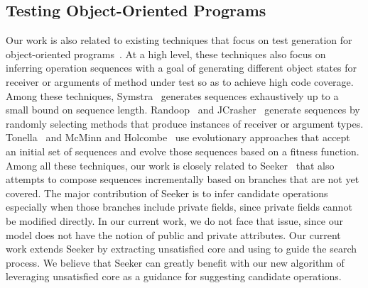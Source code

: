 \subsection{Testing Object-Oriented Programs}

Our work is also related to existing techniques that focus on test 
generation for object-oriented programs~\cite{pacheco2007,tillmann2008,thummalapenta2011, xie:symstra,
csallner:jcrasher, phil:evo, tonella:etoc}. At a high level,
these techniques also focus on inferring operation sequences 
with a goal of generating different object states for receiver
or arguments of method under test so as to achieve high code coverage.
Among these techniques, Symstra~\cite{xie:symstra} generates sequences
exhaustively up to a small bound on sequence length. 
Randoop~\cite{pacheco2007} and JCrasher~\cite{csallner:jcrasher} generate
sequences by randomly selecting methods that produce instances of receiver
or argument types. Tonella~\cite{tonella:etoc} and McMinn and Holcombe~\cite{phil:evo}
use evolutionary approaches that accept an initial set of sequences
and evolve those sequences based on a fitness function. Among all
these techniques, our work is closely related to Seeker~\cite{thummalapenta2011}
that also attempts to compose sequences incrementally based on branches that
are not yet covered. The major contribution of Seeker is to infer
candidate operations especially when those branches include private fields,
since private fields cannot be modified directly. In our current work,
we do not face that issue, since our model does not have the notion of public
and private attributes. Our current work extends Seeker by extracting
unsatisfied core and using to guide the search process. 
We believe that Seeker can greatly benefit with
our new algorithm of leveraging unsatisfied core as a guidance for suggesting
candidate operations.

